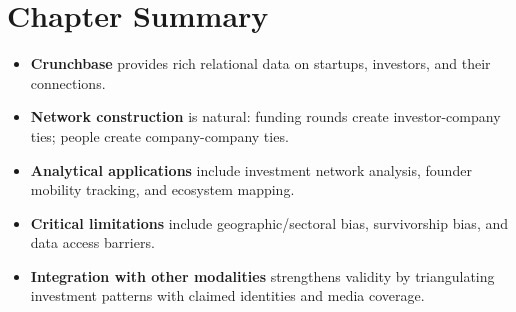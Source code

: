 \documentclass[../main.tex]{subfiles}
\begin{document}
\section*{Chapter Summary}

\begin{summarybox}
\begin{itemize}[leftmargin=*, itemsep=0.3em]
\item \textbf{Crunchbase} provides rich relational data on startups, investors, and their connections.

\item \textbf{Network construction} is natural: funding rounds create investor-company ties; people create company-company ties.

\item \textbf{Analytical applications} include investment network analysis, founder mobility tracking, and ecosystem mapping.

\item \textbf{Critical limitations} include geographic/sectoral bias, survivorship bias, and data access barriers.

\item \textbf{Integration with other modalities} strengthens validity by triangulating investment patterns with claimed identities and media coverage.
\end{itemize}
\end{summarybox}

\vspace{0.5cm}

\begin{center}
\end{center}

\closeintermezzo
\end{document}
